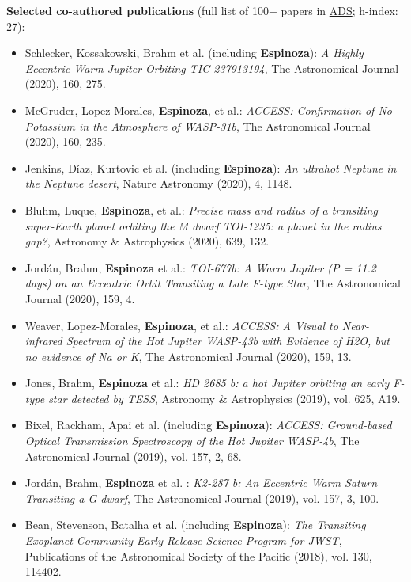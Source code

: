 \documentclass[12pt, a4paper]{article} %
\begin{document}
\begin{flushleft}
\textbf{Selected co-authored publications} (full list of 100+ papers in \href{https://ui.adsabs.harvard.edu/user/libraries/iq4EIqO4RdiPc8u53YtCZQ}{ADS}; h-index: 27):
\begin{itemize}
\setlength\itemsep{0.05cm}

\item Schlecker, Kossakowski, Brahm et al. (including \textbf{Espinoza}): \textit{A Highly Eccentric Warm Jupiter Orbiting TIC 237913194}, The Astronomical Journal (2020), 160, 275.
\item McGruder, Lopez-Morales, \textbf{Espinoza}, et al.: \textit{ACCESS: Confirmation of No Potassium in the Atmosphere of WASP-31b}, The Astronomical Journal (2020), 160, 235. 
\item Jenkins, D\'iaz, Kurtovic et al. (including \textbf{Espinoza}): \textit{An ultrahot Neptune in the Neptune desert}, Nature Astronomy (2020), 4, 1148.
\item Bluhm, Luque, \textbf{Espinoza}, et al.: \textit{Precise mass and radius of a transiting super-Earth planet orbiting the M dwarf TOI-1235: a planet in the radius gap?}, Astronomy \& Astrophysics (2020), 639, 132. 
\item Jord\'an, Brahm, \textbf{Espinoza} et al.: \textit{TOI-677b: A Warm Jupiter (P = 11.2 days) on an Eccentric Orbit Transiting a Late F-type Star}, The Astronomical Journal (2020), 159, 4. 
\item Weaver, Lopez-Morales, \textbf{Espinoza}, et al.: \textit{ACCESS: A Visual to Near-infrared Spectrum of the Hot Jupiter WASP-43b with Evidence of H2O, but no evidence of Na or K}, The Astronomical Journal (2020), 159, 13. 
\item Jones, Brahm, \textbf{Espinoza} et al.: \textit{HD 2685 b: a hot Jupiter orbiting an early F-type star detected by TESS}, Astronomy \& Astrophysics (2019), vol. 625, A19.
\item Bixel, Rackham, Apai et al. (including \textbf{Espinoza}): \textit{ACCESS: Ground-based Optical Transmission Spectroscopy of the Hot Jupiter WASP-4b}, The Astronomical Journal (2019), vol. 157, 2, 68.
\item Jord\'an, Brahm, \textbf{Espinoza} et al. : \textit{K2-287 b: An Eccentric Warm Saturn Transiting a G-dwarf}, The Astronomical Journal (2019), vol. 157, 3, 100.
\item Bean, Stevenson, Batalha et al. (including \textbf{Espinoza}): \textit{The Transiting Exoplanet Community Early Release Science Program for JWST}, Publications of the Astronomical Society of the Pacific (2018), vol. 130, 114402.

\end{itemize}
\end{flushleft}
\end{document}
